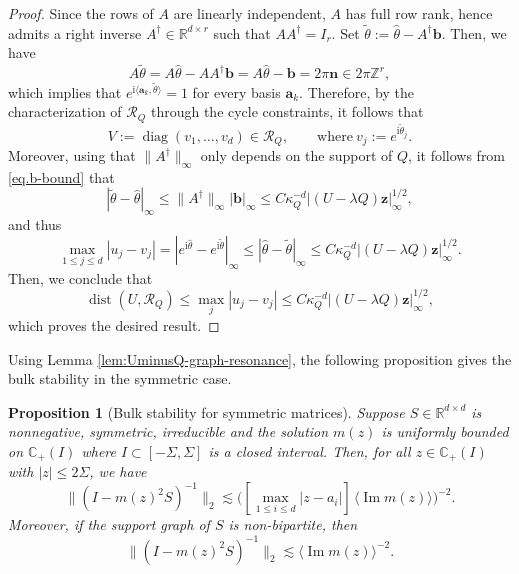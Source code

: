 \documentclass[11pt,twoside, a4paper]{article}
\numberwithin{equation}{section}
\numberwithin{figure}{section}
\theoremstyle{plain} %
\newtheorem{proposition}[theorem]{Proposition}
\theoremstyle{definition}
\theoremstyle{remark}
\newcommand{\1} {\mspace{1 mu}}
\newcommand{\2} {\mspace{2 mu}}
\newcommand{\Cp} {\mathbb {C}_+}
\DeclareMathOperator{\im}{Im}
\DeclareMathOperator{\dist}{dist}
\DeclareMathOperator{\diag}{diag}
\begin{document}
\begin{proof}
Since the rows of $A$ are linearly independent, $A$ has full row rank, hence admits a right inverse
$
A^\dagger\in\mathbb R^{d\times r}
$
such that
$
AA^\dagger=I_r.
$
Set
$
\tilde{\theta}:=\hat\theta-A^\dagger\mathbf{b}.
$
Then, we have
\[
A\tilde{\theta}=A\hat\theta-AA^\dagger\mathbf{b}=A\hat\theta-\mathbf{b}=2\pi \mathbf{n}\in 2\pi\mathbb Z^r,
\]
which implies that $e^{\mathrm i\langle \mathbf{a}_k,\tilde{\theta}\rangle}=1$ for every basis $\mathbf{a}_k$. Therefore,
by the characterization of $\mathscr{R}_Q$ through the cycle constraints, it follows that
\[
V:=\diag(v_1,\dots,v_d)\in\mathscr{R}_Q,\qquad\text{where}~v_j:=e^{\mathrm i\tilde{\theta}_j}.
\]
Moreover, using that $\|A^\dagger\|_\infty$ only depends on the support of $Q$, it follows from \eqref{eq.b-bound} that
\[
|\tilde{\theta}-\hat\theta|_\infty\le \|A^\dagger\|_\infty |\mathbf{b}|_\infty\le C\kappa_Q^{-d}|(U-\lambda Q)\mathbf z|_\infty^{1/2},
\]
and thus
\[
\max_{1\le j\le d}|u_j- v_j|
=
|e^{\mathrm i\hat\theta}-e^{\mathrm i\tilde{\theta}}|_\infty
\le |\hat\theta-\tilde{\theta}|_\infty
\le  C\kappa_Q^{-d}|(U-\lambda Q)\mathbf z|_\infty^{1/2}.
\]
Then, we conclude that
\[
\dist(U,\mathscr{R}_Q)\le \max_j |u_j-v_j|
\le C\kappa_Q^{-d}|(U-\lambda Q)\mathbf z|_\infty^{1/2},
\]
which proves the desired result.
\end{proof}


\bigskip
Using Lemma \ref{lem:UminusQ-graph-resonance}, the following proposition gives the bulk stability in the symmetric case.

\begin{proposition}[Bulk stability for symmetric matrices]\label{prop.bulk-stability-symmetric}
Suppose \(S\in\mathbb R^{d\times d}\) is nonnegative, symmetric, irreducible and the solution $m(z)$ is uniformly bounded on $\Cp(I)$ where $I\subset[-\Sigma,\Sigma]$ is a closed interval.
Then, for all $z\in\Cp(I)$ with \(|z|\le 2\Sigma\), we have
\begin{equation}\label{eq.symmetric-general-bulk-stability}
    \bigl\|(I-m(z)^2S)^{-1}\bigr\|_2
    \lesssim
    \bigl(
        [\max_{1\le i\le d}|z-a_i|]\,
        \langle\im m(z)\rangle
    \bigr)^{-2}.
\end{equation}
Moreover, if the support graph of \(S\) is non-bipartite, then
\begin{equation}\label{eq.symmetric-nonbipartite-bulk-stability}
    \bigl\|(I-m(z)^2S)^{-1}\bigr\|_2
    \lesssim
    \langle\im m(z)\rangle^{-2}.
\end{equation}
\end{proposition}
\end{document}
